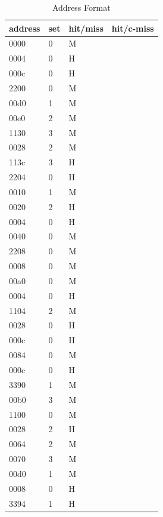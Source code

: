 \documentclass{article}
\begin{document}
\begin{table}[H]
	\centering
	\caption{Address Format}
	\label{my-label}
	\begin{tabular}{|l|l|l|l}
		\hline
		address & set & hit/miss & hit/c-miss\\ \hline
		0000    &  0   &  M        & \\ \hline
		0004    &  0   &  H        & \\ \hline
		000c    &  0   &   H       & \\ \hline
		2200    &  0   &   M       & \\ \hline
		00d0    &   1  &   M       & \\ \hline
		00e0    &   2  &   M       & \\ \hline
		1130    &   3  &   M       & \\ \hline
		0028    &   2  &   M       & \\ \hline
		113c    &   3  &   H       & \\ \hline
		2204    &   0  &   H       & \\ \hline
		0010    &  1   &   M       & \\ \hline
		0020    & 2    &   H       & \\ \hline
		0004    &0     &   H       & \\ \hline
		0040    &    0 &   M       & \\ \hline
		2208    &   0  &   M       & \\ \hline
		0008    &  0   &   M       & \\ \hline
		00a0    & 0    &   M       & \\ \hline
		0004    &0     &   H       & \\ \hline
		1104    &     2&   M       & \\ \hline
		0028    &     0&   H       & \\ \hline
		000c    &     0&   H       & \\ \hline
		0084    &     0&   M       & \\ \hline
		000c    &     0&   H       & \\ \hline
		3390    &     1&   M       & \\ \hline
		00b0    &     3&   M       & \\ \hline
		1100    &     0&   M       & \\ \hline
		0028    &     2&   H       & \\ \hline
		0064    &     2&   M       & \\ \hline
		0070    &     3&   M       & \\ \hline
		00d0    &    1 &   M       & \\ \hline
		0008    &   0  &   H       & \\ \hline
		3394    &  1   &   H       & \\ \hline
	\end{tabular}
\end{table}
\end{document}
